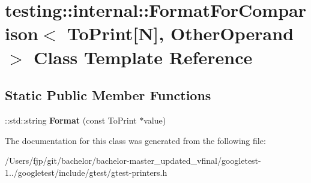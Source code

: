 \hypertarget{classtesting_1_1internal_1_1_format_for_comparison_3_01_to_print[_n]_00_01_other_operand_01_4}{}\section{testing\+:\+:internal\+:\+:Format\+For\+Comparison$<$ To\+Print\mbox{[}N\mbox{]}, Other\+Operand $>$ Class Template Reference}
\label{classtesting_1_1internal_1_1_format_for_comparison_3_01_to_print[_n]_00_01_other_operand_01_4}
\subsection*{Static Public Member Functions}
\begin{DoxyCompactItemize}
\item 
\mbox{\label{classtesting_1_1internal_1_1_format_for_comparison_3_01_to_print[_n]_00_01_other_operand_01_4_a76c526461c8fa7df75f7b32ab889b9e0}} 
\+::std\+::string {\bfseries Format} (const To\+Print $\ast$value)
\end{DoxyCompactItemize}


The documentation for this class was generated from the following file\+:\begin{DoxyCompactItemize}
\item 
/\+Users/fjp/git/bachelor/bachelor-\/master\+\_\+updated\+\_\+vfinal/googletest-\/1../googletest/include/gtest/gtest-\/printers.\+h\end{DoxyCompactItemize}
